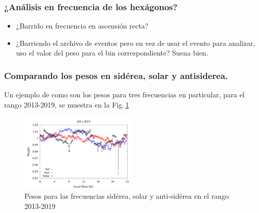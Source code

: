 \subsubsection{¿Análisis en frecuencia de los hexágonos?} \label{analisis_peso}
\begin{itemize}
	\item ¿Barrido en frecuencia en ascensión recta?
	\item ¿Barriendo el archivo de eventos pero en vez de usar el evento para analizar, uso el valor del peso para el bin correspondiente? Suena bien.
\end{itemize}



\subsubsection{Comparando los pesos en sidérea, solar y antisiderea.}

Un ejemplo de como son los pesos para tres frecuencias en particular, para el rango 2013-2019, se muestra en la Fig.\,\ref{fig:pesos}


\begin{figure}[H]
	\centering
	\includegraphics[width=0.5\textwidth]{Graficos/weigth2013-2019.png}
	\caption{Pesos para las frecuencias sidérea, solar y anti-sidérea en el rango 2013-2019}
	\label{fig:pesos}
\end{figure}


